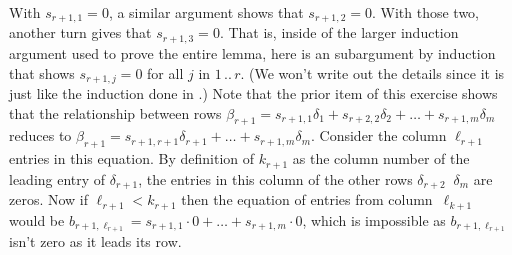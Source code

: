 \begin{exercises}
\begin{answer}
\begin{exparts}
          With $s_{r+1,1}=0$, a similar argument shows that 
          $s_{r+1,2}=0$.
          With those two, another turn gives that $s_{r+1,3}=0$.
          That is, inside of the larger induction argument used to 
          prove the entire lemma, here is an subargument by induction
          that shows $s_{r+1,j}=0$ for all $j$ in $1\,..\,r$.
          (We won't write out the details since it is just like
          the induction done in .)     
        \partsitem 
          Note that the prior item of this exercise shows that the relationship
          between rows
          $\beta_{r+1}=s_{r+1,1}\delta_1+s_{r+2,2}\delta_2
             +\dots+s_{r+1,m}\delta_m$
          reduces to  
          $\beta_{r+1}=s_{r+1,r+1}\delta_{r+1}+\dots+s_{r+1,m}\delta_m$.
          Consider the column $\ell_{r+1}$ entries in this equation.
          By definition of $k_{r+1}$ as the column number of the leading
          entry of $\delta_{r+1}$, the entries in this column of the other rows 
          $\delta_{r+2}\;\;\delta_{m}$ are zeros.
          Now if $\ell_{r+1}<k_{r+1}$
          then the equation of entries from 
          column~$\ell_{k+1}$ would be 
          $b_{r+1,\ell_{r+1}}=s_{r+1,1}\cdot 0+\dots+s_{r+1,m}\cdot 0$,
          which is impossible as $b_{r+1,\ell_{r+1}}$ isn't zero as it leads
          its row.


\end{exparts}
\end{answer}
\end{exercises}
